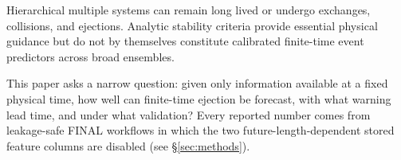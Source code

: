 Hierarchical multiple systems can remain long lived or undergo exchanges,
collisions, and ejections. Analytic stability criteria provide essential
physical guidance but do not by themselves constitute calibrated finite-time
event predictors across broad ensembles.

This paper asks a narrow question: given only information available at a fixed
physical time, how well can finite-time ejection be forecast, with what warning
lead time, and under what validation? Every reported number comes from
leakage-safe FINAL workflows in which the two future-length-dependent stored
feature columns are disabled (see \S\ref{sec:methods}).
